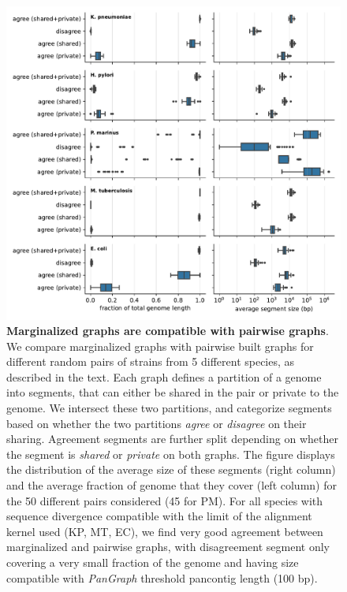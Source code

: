 \documentclass[aps,rmp,reprint,superscriptaddress,notitlepage,10pt,onecolumn]{revtex4-1}
\begin{document}
\begin{figure}[htb]
    \includegraphics[width=.9\textwidth]{figs_suppl/proj_fig.pdf}
    \caption{
        {\bf Marginalized graphs are compatible with pairwise graphs}.
        We compare marginalized graphs with pairwise built graphs for different random pairs of strains from 5 different species, as described in the text. Each graph defines a partition of a genome into segments, that can either be shared in the pair or private to the genome. We intersect these two partitions, and categorize segments based on whether the two partitions \textit{agree} or \textit{disagree} on their sharing. Agreement segments are further split depending on whether the segment is \textit{shared} or \textit{private} on both graphs. The figure displays the distribution of the average size of these segments (right column) and the average fraction of genome that they cover (left column) for the 50 different pairs considered (45 for PM).
        For all species with sequence divergence compatible with the limit of the alignment kernel used (KP, MT, EC), we find very good agreement between marginalized and pairwise graphs, with disagreement segment only covering a very small fraction of the genome and having size compatible with \textit{PanGraph} threshold pancontig length (100 bp).
    }
    \label{fig:marginalize-suppl}
\end{figure}


\end{document}
